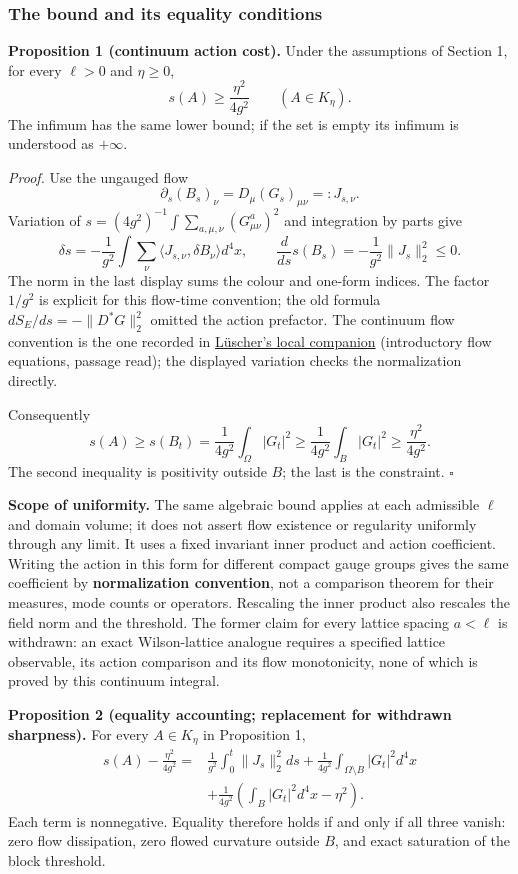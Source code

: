 \documentclass[11pt,a4paper]{article}
\begin{document}
\hypertarget{the-bound-and-its-equality-conditions}{%
\subsubsection{The bound and its equality
conditions}\label{the-bound-and-its-equality-conditions}}

\textbf{Proposition 1 (continuum action cost).} Under the assumptions of
Section 1, for every \(\ell>0\) and \(\eta\ge0\),
\[s(A)\ge\frac{\eta^2}{4g^2}\qquad(A\in K_\eta).\] The infimum has the
same lower bound; if the set is empty its infimum is understood as
\(+\infty\).

\emph{Proof.} Use the ungauged flow
\[\partial_s(B_s)_\nu=D_\mu(G_s)_{\mu\nu}=:J_{s,\nu}.\] Variation of
\(s=(4g^2)^{-1}\int\sum_{a,\mu,\nu}(G^a_{\mu\nu})^2\) and integration by
parts give
\[\delta s=-\frac1{g^2}\int\sum_\nu\langle J_{s,\nu},\delta B_\nu\rangle d^4x,
\qquad \frac{d}{ds}s(B_s)=-\frac1{g^2}\|J_s\|_2^2\le0.\] The norm in the
last display sums the colour and one-form indices. The factor \(1/g^2\)
is explicit for this flow-time convention; the old formula
\(dS_E/ds=-\|D^*G\|_2^2\) omitted the action prefactor. The continuum
flow convention is the one recorded in
\href{../docs/Luscher_WilsonFlow_1006.4518v3.md}{Lüscher's local
companion} (introductory flow equations, passage read); the displayed
variation checks the normalization directly.

Consequently \[s(A)\ge s(B_t)=\frac1{4g^2}\int_\Omega|G_t|^2
\ge\frac1{4g^2}\int_B|G_t|^2
\ge\frac{\eta^2}{4g^2}.\] The second inequality is positivity outside
\(B\); the last is the constraint. \(\square\)

\textbf{Scope of uniformity.} The same algebraic bound applies at each
admissible \(\ell\) and domain volume; it does not assert flow existence
or regularity uniformly through any limit. It uses a fixed invariant
inner product and action coefficient. Writing the action in this form
for different compact gauge groups gives the same coefficient by
\textbf{normalization convention}, not a comparison theorem for their
measures, mode counts or operators. Rescaling the inner product also
rescales the field norm and the threshold. The former claim for every
lattice spacing \(a<\ell\) is withdrawn: an exact Wilson-lattice
analogue requires a specified lattice observable, its action comparison
and its flow monotonicity, none of which is proved by this continuum
integral.

\textbf{Proposition 2 (equality accounting; replacement for withdrawn
sharpness).} For every \(A\in K_\eta\) in Proposition 1,
\[\begin{aligned}
s(A)-\frac{\eta^2}{4g^2}
={}&\frac1{g^2}\int_0^t\|J_s\|_2^2ds
+\frac1{4g^2}\int_{\Omega\setminus B}|G_t|^2d^4x\\
&+\frac1{4g^2}\left(\int_B|G_t|^2d^4x-\eta^2\right).
\end{aligned}\] Each term is nonnegative. Equality therefore holds if
and only if all three vanish: zero flow dissipation, zero flowed
curvature outside \(B\), and exact saturation of the block threshold.
\end{document}
